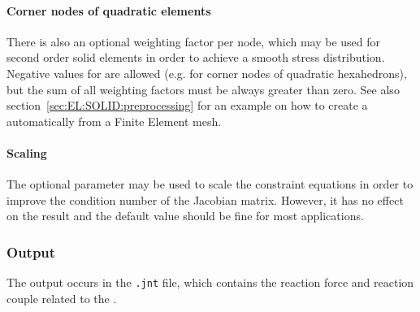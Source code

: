 \paragraph{Corner nodes of quadratic elements}
There is also an optional weighting factor  per node, which may be used for second order solid elements in order to achieve a smooth stress distribution.
Negative values for  are allowed (e.g. for corner nodes of quadratic hexahedrons), but the sum of all weighting factors must be always greater than zero.
See also section~\ref{sec:EL:SOLID:preprocessing} for an example on how to create a  automatically from a Finite Element mesh.
\paragraph{Scaling}
The optional parameter  may be used to scale the constraint equations in order to improve the condition number of the Jacobian matrix.
However, it has no effect on the result and the default value should be fine for most applications.

\subsubsection{Output}
The output occurs in the \texttt{.jnt} file, which contains the reaction force and reaction couple related to the .

